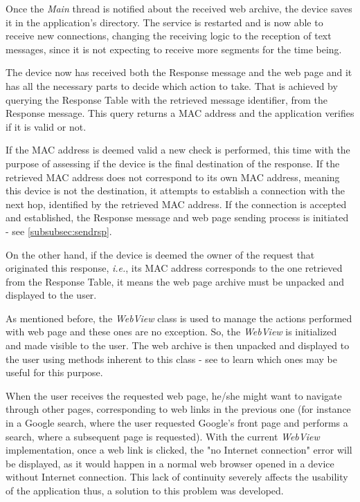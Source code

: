 Once the \textit{Main} thread is notified about the received web archive, the device saves it in the application's directory. The service is restarted and is now able to receive new connections, changing the receiving logic to the reception of text messages, since it is not expecting to receive more segments for the time being.

The device now has received both the Response message and the web page and it has all the necessary parts to decide which action to take. That is achieved by querying the Response Table with the retrieved message identifier, from the Response message. This query returns a \gls{MAC} address and the application verifies if it is valid or not.

If the \gls{MAC} address is deemed valid a new check is performed, this time with the purpose of assessing if the device is the final destination of the response. If the retrieved \gls{MAC} address does not correspond to its own \gls{MAC} address, meaning this device is not the destination, it attempts to establish a connection with the next hop, identified by the retrieved \gls{MAC} address. If the connection is accepted and established, the Response message and web page sending process is initiated - see \ref{subsubsec:sendrsp}.

On the other hand, if the device is deemed the owner of the request that originated this response, \textit{i.e.}, its \gls{MAC} address corresponds to the one retrieved from the Response Table, it means the web page archive must be unpacked and displayed to the user.

As mentioned before, the \textit{WebView} class is used to manage the actions performed with web page and these ones are no exception. So, the \textit{WebView} is initialized and made visible to the user. The web archive is then unpacked and displayed to the user using methods inherent to this class - see \cite{webview} to learn which ones may be useful for this purpose.

When the user receives the requested web page, he/she might want to navigate through other pages, corresponding to web links in the previous one (for instance in a Google search, where the user requested Google's front page and performs a search, where a subsequent page is requested). With the current \textit{WebView} implementation, once a web link is clicked, the "no Internet connection" error will be displayed, as it would happen in a normal web browser opened in a device without Internet connection. This lack of continuity severely affects the usability of the application thus, a solution to this problem was developed.

